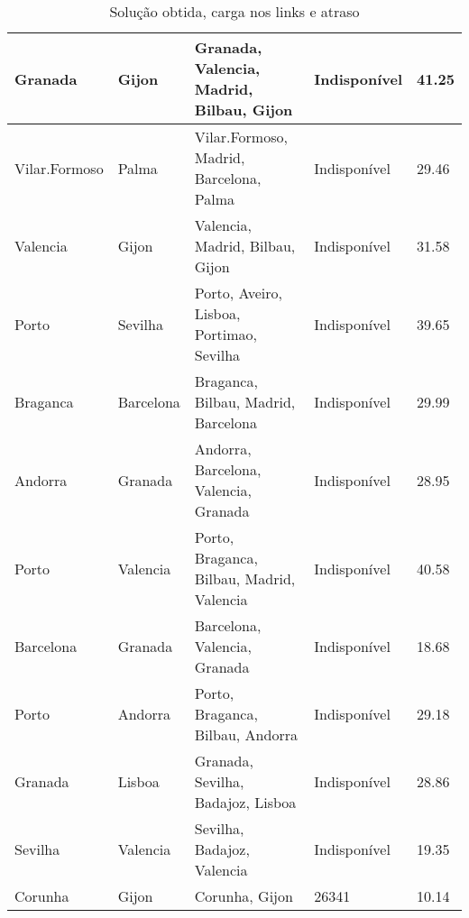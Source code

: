 \begin{table}[!htb]
{\begin{tabular}{|l|l|l|l|l|}
Granada & Gijon & Granada, Valencia, Madrid, Bilbau, Gijon & Indisponível & 41.25 \\ \hline
Vilar.Formoso & Palma & Vilar.Formoso, Madrid, Barcelona, Palma & Indisponível & 29.46 \\ \hline
Valencia & Gijon & Valencia, Madrid, Bilbau, Gijon & Indisponível & 31.58 \\ \hline
Porto & Sevilha & Porto, Aveiro, Lisboa, Portimao, Sevilha & Indisponível & 39.65 \\ \hline
Braganca & Barcelona & Braganca, Bilbau, Madrid, Barcelona & Indisponível & 29.99 \\ \hline
Andorra & Granada & Andorra, Barcelona, Valencia, Granada & Indisponível & 28.95 \\ \hline
Porto & Valencia & Porto, Braganca, Bilbau, Madrid, Valencia & Indisponível & 40.58 \\ \hline
Barcelona & Granada & Barcelona, Valencia, Granada & Indisponível & 18.68 \\ \hline
Porto & Andorra & Porto, Braganca, Bilbau, Andorra & Indisponível & 29.18 \\ \hline
Granada & Lisboa & Granada, Sevilha, Badajoz, Lisboa & Indisponível & 28.86 \\ \hline
Sevilha & Valencia & Sevilha, Badajoz, Valencia & Indisponível & 19.35 \\ \hline
Corunha & Gijon & Corunha, Gijon & 26341 & 10.14 \\ \hline
\end{tabular}}
\caption[]{Solução obtida, carga nos links e atraso}
\end{table}

\begin{table}[!htb]
        \centering
\caption[]{Solução obtida, carga nos links e atraso}
\end{table}

